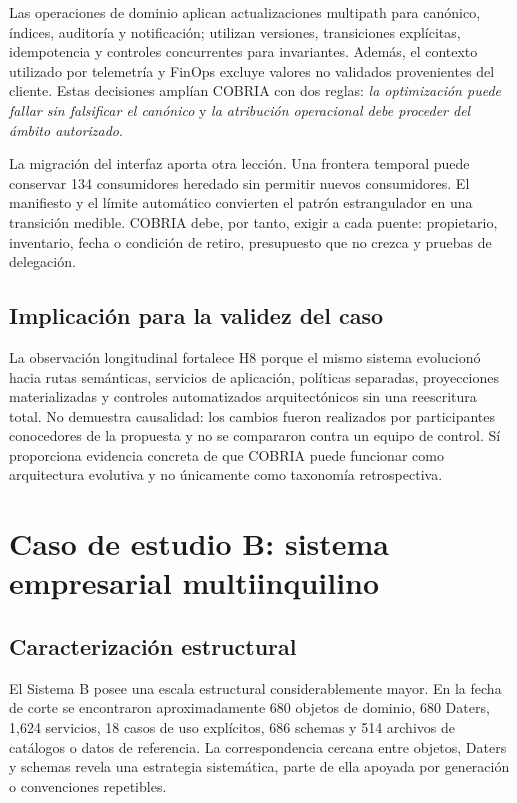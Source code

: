 Las operaciones de dominio aplican actualizaciones multipath para canónico, índices,
auditoría y notificación; utilizan versiones, transiciones explícitas, idempotencia y
controles concurrentes para invariantes. Además, el contexto utilizado por telemetría y
FinOps excluye valores no validados provenientes del cliente. Estas decisiones amplían
COBRIA con dos reglas: \emph{la optimización puede fallar sin falsificar el canónico} y
\emph{la atribución operacional debe proceder del ámbito autorizado}.

La migración del interfaz aporta otra lección. Una frontera temporal puede conservar
134 consumidores heredado sin permitir nuevos consumidores. El manifiesto y el límite
automático convierten el patrón estrangulador en una transición medible. COBRIA debe, por
tanto, exigir a cada puente: propietario, inventario, fecha o condición de retiro,
presupuesto que no crezca y pruebas de delegación.

\section{Implicación para la validez del caso}

La observación longitudinal fortalece H8 porque el mismo sistema evolucionó hacia rutas
semánticas, servicios de aplicación, políticas separadas, proyecciones materializadas y
controles automatizados arquitectónicos sin una reescritura total. No demuestra causalidad: los cambios
fueron realizados por participantes conocedores de la propuesta y no se compararon
contra un equipo de control. Sí proporciona evidencia concreta de que COBRIA puede
funcionar como arquitectura evolutiva y no únicamente como taxonomía retrospectiva.

\chapter{Caso de estudio B: sistema empresarial multiinquilino}

\section{Caracterización estructural}

El Sistema B posee una escala estructural considerablemente mayor. En la fecha de corte
se encontraron aproximadamente 680 objetos de dominio, 680 Daters, 1,624 servicios, 18
casos de uso explícitos, 686 schemas y 514 archivos de catálogos o datos de referencia.
La correspondencia cercana entre objetos, Daters y schemas revela una estrategia
sistemática, parte de ella apoyada por generación o convenciones repetibles.

